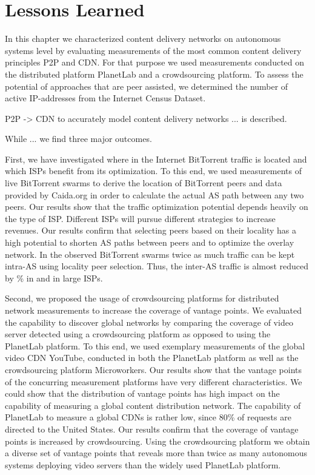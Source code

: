 \section{Lessons Learned}\label{sec:application:lessons_learned}
In this chapter we characterized content delivery networks on autonomous systems level by evaluating measurements of the most common content delivery principles P2P and CDN.
For that purpose we used measurements conducted on the distributed platform PlanetLab and a crowdsourcing platform.
To assess the potential of approaches that are peer assisted, we determined the number of active IP-addresses from the Internet Census Dataset.

P2P -> CDN
to accurately model content delivery networks ... is described.

While ... we find three major outcomes.

First, we have investigated where in the Internet BitTorrent traffic is located and which ISPs benefit from its optimization. To this end, we used measurements of live BitTorrent swarms to derive the location of BitTorrent peers and data provided by Caida.org in order to calculate the actual AS path between any two peers.
Our results show that the traffic optimization potential depends heavily on the type of ISP. Different ISPs will pursue different strategies to increase revenues.
Our results confirm that selecting peers based on their locality has a high potential to shorten AS paths between peers and to optimize the overlay network. In the observed BitTorrent swarms twice as much traffic can be kept intra-AS using locality peer selection. Thus, the inter-AS traffic is almost reduced by \unit[50]{\%} in \tier and in large ISPs.

Second, we proposed the usage of crowdsourcing platforms for distributed network measurements to increase the coverage of vantage points.
We evaluated the capability to discover global networks by comparing the coverage of video server detected using a crowdsourcing platform as opposed to using the PlanetLab platform.
To this end, we used exemplary measurements of the global video CDN YouTube, conducted in both the PlanetLab platform as well as the crowdsourcing platform Microworkers.
Our results show that the vantage points of the concurring measurement platforms have very different characteristics.
We could show that the distribution of vantage points has high impact on the capability of measuring a global content distribution network.
The capability of PlanetLab to measure a global CDNs is rather low, since 80\% of requests are directed to the United States.
Our results confirm that the coverage of vantage points is increased by crowdsourcing.
Using the crowdsourcing platform we obtain a diverse set of vantage points that reveals more than twice as many autonomous systems deploying video servers than the widely used PlanetLab platform.

